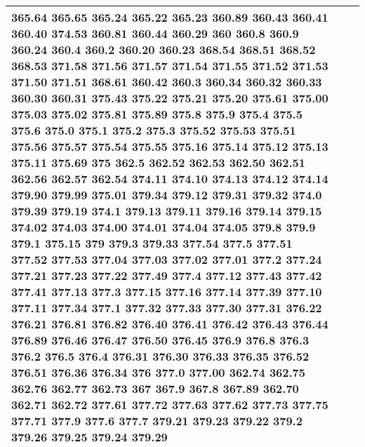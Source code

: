 \begin{longtable}{|L{.1in}|L{.6in}||L{5.65in}|}
365.64 365.65 365.24 365.22 365.23 360.89 360.43 360.41 360.40 374.53 360.81 360.44 360.29 360 360.8 360.9 360.24 360.4 360.2 360.20 360.23 368.54 368.51 368.52 368.53 371.58 371.56 371.57 371.54 371.55 371.52 371.53 371.50 371.51 368.61 360.42 360.3 360.34 360.32 360.33 360.30 360.31 375.43 375.22 375.21 375.20 375.61 375.00 375.03 375.02 375.81 375.89 375.8 375.9 375.4 375.5 375.6 375.0 375.1 375.2 375.3 375.52 375.53 375.51 375.56 375.57 375.54 375.55 375.16 375.14 375.12 375.13 375.11 375.69 375 362.5 362.52 362.53 362.50 362.51 362.56 362.57 362.54 374.11 374.10 374.13 374.12 374.14 379.90 379.99 375.01 379.34 379.12 379.31 379.32 374.0 379.39 379.19 374.1 379.13 379.11 379.16 379.14 379.15 374.02 374.03 374.00 374.01 374.04 374.05 379.8 379.9 379.1 375.15 379 379.3 379.33 377.54 377.5 377.51 377.52 377.53 377.04 377.03 377.02 377.01 377.2 377.24 377.21 377.23 377.22 377.49 377.4 377.12 377.43 377.42 377.41 377.13 377.3 377.15 377.16 377.14 377.39 377.10 377.11 377.34 377.1 377.32 377.33 377.30 377.31 376.22 376.21 376.81 376.82 376.40 376.41 376.42 376.43 376.44 376.89 376.46 376.47 376.50 376.45 376.9 376.8 376.3 376.2 376.5 376.4 376.31 376.30 376.33 376.35 376.52 376.51 376.36 376.34 376 377.0 377.00 362.74 362.75 362.76 362.77 362.73 367 367.9 367.8 367.89 362.70 362.71 362.72 377.61 377.72 377.63 377.62 377.73 377.75 377.71 377.9 377.6 377.7 379.21 379.23 379.22 379.2 379.26 379.25 379.24 379.29\\\hline

\end{longtable}
